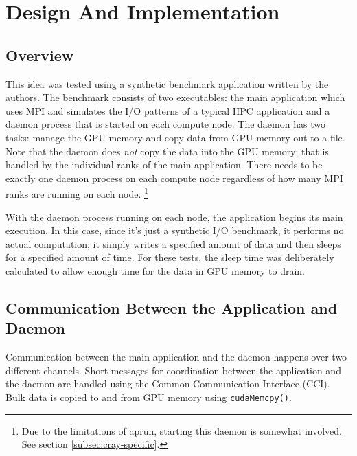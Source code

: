 \section{Design And Implementation}
\label{sec:design}

\subsection{Overview}
\label{subsec:overview}
This idea was tested using a synthetic benchmark application written by the authors.  The benchmark consists of two executables: the main application which uses MPI and simulates the I/O patterns of a typical HPC application and a daemon process that is started on each compute node.  The daemon has two tasks: manage the GPU memory and copy data from GPU memory out to a file.  Note that the daemon does \emph{not} copy the data into the GPU memory; that is handled by the individual ranks of the main application.   There needs to be exactly one daemon process on each compute node regardless of how many MPI ranks are running on each node.  \footnote{Due to the limitations of aprun, starting this daemon is somewhat involved.  See section \ref{subsec:cray-specific}.}

With the daemon process running on each node, the application begins its main execution.  In this case, since it's just a synthetic 
I/O benchmark, it performs no actual computation; it simply writes a specified amount of data and then sleeps for a specified amount of time.  For these tests, the sleep time was deliberately calculated to allow enough time for the data in GPU memory to drain.
\subsection{Communication Between the Application and Daemon}
\label{subsec:comm}

Communication between the main application and the daemon happens over two different channels.  Short messages for coordination between the application and the daemon are handled using the Common Communication Interface (CCI).\cite{atchley11:cci}  Bulk data is copied to and from GPU memory using \texttt{cudaMemcpy()}.


